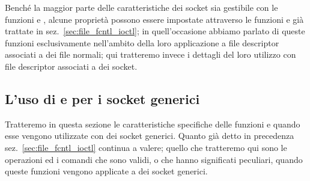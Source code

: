 Benché la maggior parte delle caratteristiche dei socket sia gestibile con le
funzioni  e , alcune proprietà possono
essere impostate attraverso le funzioni  e  già
trattate in sez.~\ref{sec:file_fcntl_ioctl}; in quell'occasione abbiamo
parlato di queste funzioni esclusivamente nell'ambito della loro applicazione
a file descriptor associati a dei file normali; qui tratteremo invece i
dettagli del loro utilizzo con file descriptor associati a dei socket.


\subsection{L'uso di  e  per i socket generici}
\label{sec:sock_ioctl}

Tratteremo in questa sezione le caratteristiche specifiche delle funzioni
 e  quando esse vengono utilizzate con dei socket
generici. Quanto già detto in precedenza sez.~\ref{sec:file_fcntl_ioctl}
continua a valere; quello che tratteremo qui sono le operazioni ed i comandi
che sono validi, o che hanno significati peculiari, quando queste funzioni
vengono applicate a dei socket generici.

